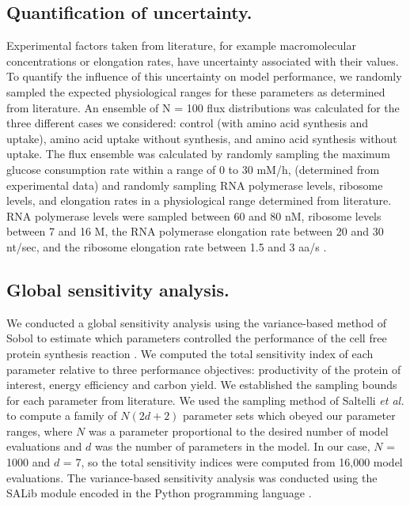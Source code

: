 \documentclass[journal=asbcd6,manuscript=article]{achemso}
\begin{document}
\subsection*{Quantification of uncertainty.}
Experimental factors taken from literature, for example macromolecular concentrations or elongation rates, have uncertainty associated with their values.
To quantify the influence of this uncertainty on model performance, we randomly sampled the expected physiological ranges for these parameters as determined from literature.
An ensemble of N = 100 flux distributions was calculated for the three different cases we considered:
control (with amino acid synthesis and uptake), amino acid uptake without synthesis, and amino acid synthesis without uptake.
The flux ensemble was calculated by randomly sampling the maximum glucose consumption rate within a range of 0 to 30 mM/h, (determined from experimental data)
and randomly sampling RNA polymerase levels, ribosome levels, and elongation rates in a physiological range determined from literature.
RNA polymerase levels were sampled between 60 and 80 nM, ribosome levels between 7 and 16 \textmu M, the RNA polymerase elongation rate between 20 and 30 nt/sec, and the ribosome elongation rate between 1.5 and 3 aa/s \cite{2005_underwood_biotech, Garamella:2016aa}.

\subsection*{Global sensitivity analysis.}
We conducted a global sensitivity analysis using the variance-based method of Sobol to estimate which parameters controlled the performance of the cell free protein synthesis reaction \citep{SOBOL_METHOD}.
We computed the total sensitivity index of each parameter relative to three performance objectives: productivity of the protein of interest, energy efficiency and carbon yield.
We established the sampling bounds for each parameter from literature.
We used the sampling method of Saltelli \textit{et al.} \citep{Saltelli:2010} to compute a family of $N\left(2d+2\right)$ parameter sets which obeyed our parameter ranges,
where $N$ was a parameter proportional to the desired number of model evaluations and $d$ was the number of parameters in the model. In our case, $N$ = 1000 and $d$ = 7, so the total sensitivity indices were computed from 16,000 model evaluations. The variance-based sensitivity analysis was conducted using the SALib module encoded in the Python programming language \citep{SALIB}.
\end{document}
